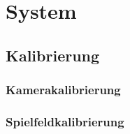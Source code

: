 \section{System}
\subsection{Kalibrierung}
\subsubsection{Kamerakalibrierung}
\subsubsection{Spielfeldkalibrierung}


